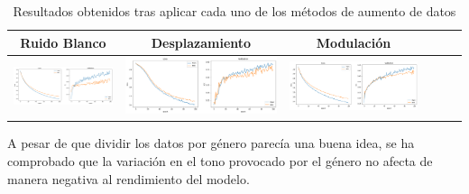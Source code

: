 \documentclass[11pt,a4paper,spanish]{book}
\begin{document}
			
			\begin{table}[H]
			\centering
			\begin{center}
				\begin{tabular}{| c | c | c | c | c | c |}
					\hline
					Ruido Blanco & Desplazamiento & Modulación \\ 
					\hline
					 \includegraphics[scale=0.15]{results/white_noise1.png} & \includegraphics[scale=0.15]{results/shiftting_1.png} & \includegraphics[scale=0.15]{results/pitch.png}\\
					
					\hline	
				\end{tabular}
				\caption{Resultados obtenidos tras aplicar cada uno de los métodos de aumento de datos}
				\label{tab:augmentationData_1}
			\end{center}
		\end{table}
	
		A pesar de que dividir los datos por género parecía una buena idea, se ha comprobado que la variación en el tono provocado por el género no afecta de manera negativa al rendimiento del modelo.
		
\end{document}
